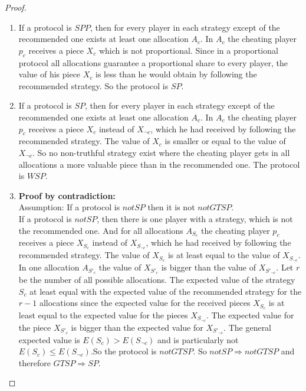 \begin{proof}
\textcolor{white}{x}
\begin{enumerate}
\item If a protocol is $SPP$, then for every player in each strategy except of the recommended one exists at least one allocation $A_c$. In $A_c$ the cheating player $p_c$ receives a piece $X_c$ which is not proportional. Since in a proportional protocol all allocations guarantee a proportional share to every player, the value of his piece $X_c$ is less than he would obtain by following the recommended strategy. So the protocol is $SP$.   
\item If a protocol is $SP$, then for every player in each strategy except of the recommended one exists at least one allocation $A_c$. In $A_c$ the cheating player $p_c$ receives a piece $X_{c}$ instead of $X_{\neg c}$, which he had received by following the recommended strategy. The value of $X_c$ is smaller or equal to the value of $X_{\neg c}$. So no non-truthful strategy exist where the cheating player gets in all allocations a more valuable piece than in the recommended one. The protocol is $WSP$.
\pagebreak
\item \textbf{Proof by contradiction:}\\
\newline
Assumption: If a protocol is $notSP$ then it is not $notGTSP$.\\
If a protocol is $notSP$, then there is one player with a strategy, which is not the recommended one. And for all allocations $A_{S_c}$ the cheating player $p_c$ receives a piece $X_{S_c}$ instead of $X_{S_{\neg c}}$, which he had received by following the recommended strategy. The value of $X_{S_c}$ is at least equal to the value of $X_{S_{\neg c}}$. In one allocation $A_{S'_c}$ the value of $X_{S'_c}$ is bigger than the value of $X_{S'_{\neg c}}$. Let $r$ be the number of all possible allocations. The expected value of the strategy ${S_c}$ at least equal with the expected value of the recommended strategy for the $r-1$ allocations since the expected value for the received pieces $X_{S_c}$ is at least equal to the expected value for the pieces $X_{S_{\neg c}}$. The expected value for the piece $X_{S'_c}$ is bigger than the expected value for $X_{S'_{\neg c}}$. The general expected value is $E(S_c)>E(S_{\neg c})$ and is particularly not $E(S_c)\leq E(S_{\neg c})$.\blitza So the protocol is $notGTSP$.  
\newline
So $notSP \Rightarrow notGTSP$ and therefore $GTSP \Rightarrow SP$.
\end{enumerate}
\end{proof} 

